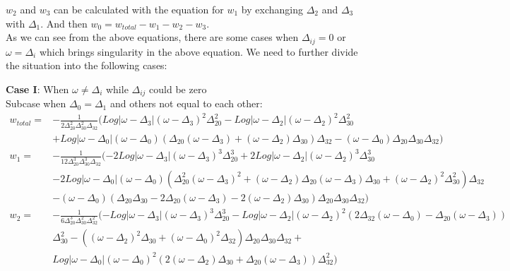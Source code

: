 \documentclass[10pt]{article}
\begin{document}
$w_2$ and $w_3$ can be calculated with the equation for $w_1$ by exchanging $\Delta_2$ and $\Delta_3$ with $\Delta_1$. And then $w_0=w_{total}-w_1-w_2-w_3$.\\

As we can see from the above equations, there are some cases when $\Delta_{ij}=0$ or $\omega=\Delta_i$ which brings singularity in the above equation. We need to further divide the situation into the following cases:

\textbf{Case I}: When $\omega\neq\Delta_{i}$ while $\Delta_{ij}$ could be zero\\
 
Subcase when $\Delta_{0}=\Delta_{1}$ and others not equal to each other:\\

\begin{subequations}\label{wtt2}
\begin{align}
w_{total}=&-\frac{1}{2\Delta_{20}^2\Delta_{30}^2\Delta_{32}}(Log|\omega-\Delta_3|(\omega-\Delta_3)^2\Delta_{20}^2-Log|\omega-\Delta_2|(\omega-\Delta_2)^2\Delta_{30}^2\nonumber\\
&+Log|\omega-\Delta_0|(\omega-\Delta_0)(\Delta_{20}(\omega-\Delta_3)+(\omega-\Delta_2)\Delta_{30})\Delta_{32}-(\omega-\Delta_0)\Delta_{20}\Delta_{30}\Delta_{32})\\
w_{1}=&-\frac{1}{12\Delta_{20}^3\Delta_{30}^3\Delta_{32}}(-2Log|\omega-\Delta_3|(\omega-\Delta_3)^3\Delta_{20}^3+
2Log|\omega-\Delta_2|(\omega-\Delta_2)^3\Delta_{30}^3\nonumber\\
&-2Log|\omega-\Delta_0|(\omega-\Delta_0)(\Delta_{20}^2(\omega-\Delta_3)^2+(\omega-\Delta_2)\Delta_{20}(\omega-\Delta_{3})\Delta_{30}+(\omega-\Delta_2)^2\Delta_{30}^2)\Delta_{32}\nonumber\\&-(\omega-\Delta_0)(\Delta_{20}\Delta_{30}-2\Delta_{20}(\omega-\Delta_3)-2(\omega-\Delta_2)\Delta_{30})\Delta_{20}\Delta_{30}\Delta_{32})\\
w_{2}=&-\frac{1}{6\Delta_{20}^3\Delta_{30}^2\Delta_{32}^2}(-Log|\omega-\Delta_3|(\omega-\Delta_3)^3\Delta_{20}^3-Log|\omega-\Delta_2|(\omega-\Delta_2)^2(2\Delta_{32}(\omega-\Delta_0)-\Delta_{20}(\omega-\Delta_3))\nonumber\\&\Delta_{30}^2-((\omega-\Delta_2)^2\Delta_{30}+(\omega-\Delta_{0})^2\Delta_{32})\Delta_{20}\Delta_{30}\Delta_{32}+\nonumber\\&Log|\omega-\Delta_0|(\omega-\Delta_{0})^2(2(\omega-\Delta_2)\Delta_{30}+\Delta_{20}(\omega-\Delta_3))\Delta_{32}^2)
\end{align}
\end{subequations}
\end{document}
